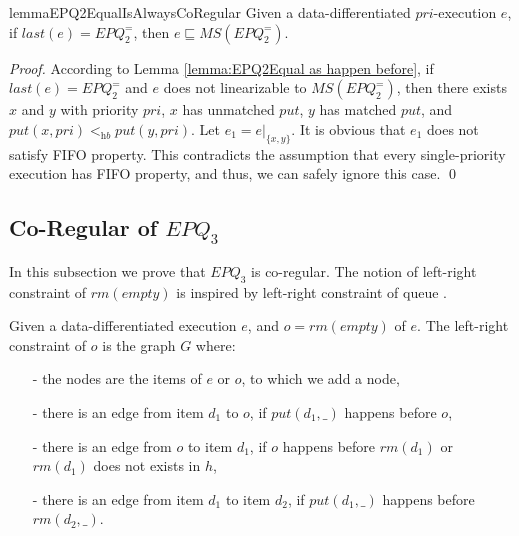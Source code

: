 \begin{restatable}{lemma}{EPQ2EqualIsAlwaysCoRegular}
\label{lemma:EPQ2Equal is always co-regular}
Given a data-differentiated $\textit{pri}$-execution $e$, if $\textit{last}(e) = \textit{EPQ}_2^{=}$, then $e \sqsubseteq \textit{MS}(\textit{EPQ}_2^{=})$.
\end{restatable}

\begin {proof}

According to Lemma \ref{lemma:EPQ2Equal as happen before}, if $\textit{last}(e) = \textit{EPQ}_2^{=}$ and $e$ does not linearizable to $\textit{MS}(\textit{EPQ}_2^{=})$, then there exists $x$ and $y$ with priority $\textit{pri}$, $x$ has unmatched $\textit{put}$, $y$ has matched $\textit{put}$, and $\textit{put}(x,\textit{pri}) <_{\textit{hb}} \textit{put}(y,\textit{pri})$. Let $e_1 = e \vert_{ \{ x,y \} }$. It is obvious that $e_1$ does not satisfy FIFO property. This contradicts the assumption that every single-priority execution has FIFO property, and thus, we can safely ignore this case. \qed
\end {proof}




\subsection{Co-Regular of $\textit{EPQ}_3$}
\label{subsec:co-regular of EPQ3}

In this subsection we prove that $\textit{EPQ}_3$ is co-regular. The notion of left-right constraint of $\textit{rm}(\textit{empty})$ is inspired by left-right constraint of queue \cite{Bouajjani:2015}.

\begin{definition}\label{def:left-right constraint for rmEmpty operation}
Given a data-differentiated execution $e$, and $o = \textit{rm}(\textit{empty})$ of $e$. The left-right constraint of $o$ is the graph $G$ where:

\begin{itemize}
\setlength{\itemsep}{0.5pt}
\item[-] the nodes are the items of $e$ or $o$, to which we add a node,

\item[-] there is an edge from item $d_1$ to $o$, if $\textit{put}(d_1,\_)$ happens before $o$,

\item[-] there is an edge from $o$ to item $d_1$, if $o$ happens before $\textit{rm}(d_1)$ or $\textit{rm}(d_1)$ does not exists in $h$,

\item[-] there is an edge from item $d_1$ to item $d_2$, if $\textit{put}(d_1,\_)$ happens before $\textit{rm}(d_2,\_)$.
\end{itemize}
\end{definition}


